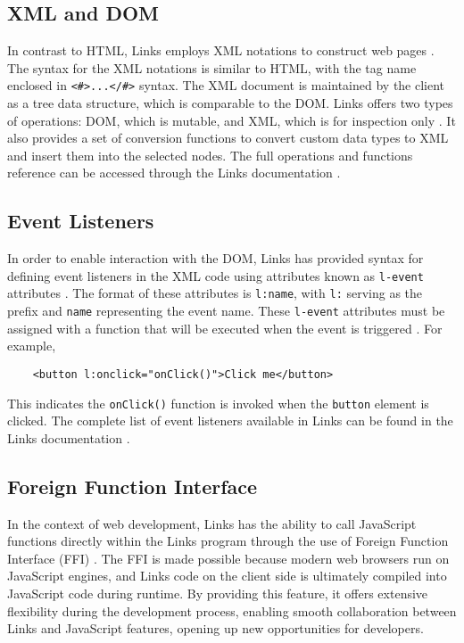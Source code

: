 \documentclass[logo,bsc,singlespacing,parskip]{infthesis}
\begin{document}
\subsection{XML and DOM}

In contrast to HTML, Links employs XML notations to construct web pages \cite{links}. The syntax for the XML notations is similar to HTML, with the tag name enclosed in \texttt{<\#>...</\#>} syntax. The XML document is maintained by the client as a tree data structure, which is comparable to the DOM. Links offers two types of operations: DOM, which is mutable, and XML, which is for inspection only \cite{links}. It also provides a set of conversion functions to convert custom data types to XML and insert them into the selected nodes. The full operations and functions reference can be accessed through the Links documentation \cite{links_doc}.

\subsection{Event Listeners}

In order to enable interaction with the DOM, Links has provided syntax for defining event listeners in the XML code using attributes known as \texttt{l-event} attributes \cite{links_doc}. The format of these attributes is \texttt{l:name}, with \texttt{l:} serving as the prefix and \texttt{name} representing the event name. These \texttt{l-event} attributes must be assigned with a function that will be executed when the event is triggered \cite{links}. For example,
\begin{verbatim}
    <button l:onclick="onClick()">Click me</button>
\end{verbatim}
 This indicates the \texttt{onClick()} function is invoked when the \texttt{button} element is clicked. The complete list of event listeners available in Links can be found in the Links documentation \cite{links_doc}.

\subsection{Foreign Function Interface}

In the context of web development, Links has the ability to call JavaScript functions directly within the Links program through the use of Foreign Function Interface (FFI) \cite{links_ffi}. The FFI is made possible because modern web browsers run on JavaScript engines, and Links code on the client side is ultimately compiled into JavaScript code during runtime. By providing this feature, it offers extensive flexibility during the development process, enabling smooth collaboration between Links and JavaScript features, opening up new opportunities for developers.
\end{document}
